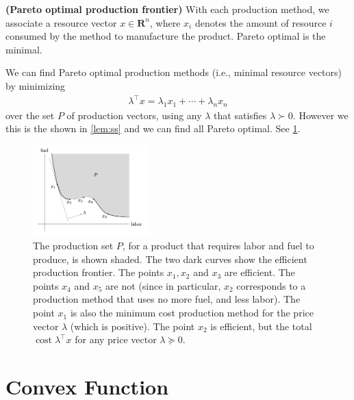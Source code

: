 \documentclass{article}
\newcommand{\bfs}[1]{\textbf{({#1}) }}
\begin{document}
\begin{exma}{\bfs{Pareto optimal production frontier}}
   With each production method, we associate a resource vector $x \in \mathbf{R}^{n}$, where $x_{i}$ denotes the amount of resource $i$ consumed by the method to manufacture the product. Pareto optimal is the minimal.

We can find Pareto optimal production methods (i.e., minimal resource vectors) by minimizing
\begin{align*}
\lambda^{\top} x=\lambda_{1} x_{1}+\cdots+\lambda_{n} x_{n}
\end{align*}
over the set $P$ of production vectors, using any $\lambda$ that satisfies $\lambda \succ 0$. However we this is the  shown in \cref{lem:ss} and  we can find all Pareto optimal. See \cref{fig:duan_mini_nfbgf}.
\begin{figure}[H]
    \centering
    \includegraphics[width=0.4\textwidth]{Figs/5.png}
    \caption{The production set $P$, for a product that requires labor and fuel to produce, is shown shaded. The two dark curves show the efficient production frontier. The points $x_{1}, x_{2}$ and $x_{3}$ are efficient. The points $x_{4}$ and $x_{5}$ are not (since in particular, $x_{2}$ corresponds to a production method that uses no more fuel, and less labor). The point $x_{1}$ is also the minimum cost production method for the price vector $\lambda$ (which is positive). The point $x_{2}$ is efficient, but  the total $\operatorname{cost} \lambda^{\top} x$ for any price vector $\lambda \succeq 0$.}
    \label{fig:duan_mini_nfbgf}
\end{figure}
\end{exma}

\section{Convex Function}\label{sec:conx_f}
\end{document}
